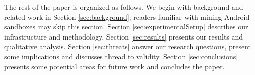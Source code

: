 


The rest of the paper is organized as follows. We begin with background and related work in Section \ref{sec:background};
readers familiar with mining Android sandboxes may skip this section.
Section \ref{sec:experimentalSetup} describes our infrastructure and methodology. Section \ref{sec:results} presents our results and qualitative analysis. Section \ref{sec:threats} answer our research questions, present some implications and discusses thread to validity. Section \ref{sec:conclusions} 
presents some potential areas for future work and concludes the paper.
